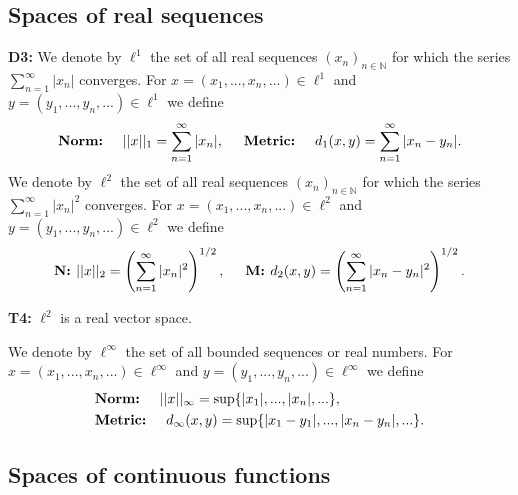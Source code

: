 \documentclass[twocolumn,10pt]{article}
\begin{document}
\subsection*{Spaces of real sequences}

\textbf{D3:} We denote by $\ell^1$ the set of all real sequences $(x_n)_{n\in\mathbb{N}}$ for which the series $\sum_{n=1}^{\infty}|x_n|$ converges. For $x=(x_1,...,x_n,...)\in\ell^1$ and $y=(y_1,...,y_n,...)\in\ell^1$ we define
\begin{equation*}
    \textbf{Norm:} \hspace{0.5cm} ||x||_1 = \sum_{n=1}^{\infty}|x_n|, \hspace{0.5cm} \textbf{Metric:} \hspace{0.5cm} d_1(x,y) = \sum_{n=1}^{\infty}|x_n-y_n|.
\end{equation*}
We denote by $\ell^2$ the set of all real sequences $(x_n)_{n\in\mathbb{N}}$ for which the series $\sum_{n=1}^{\infty}|x_n|^2$ converges. For $x=(x_1,...,x_n,...)\in\ell^2$ and $y=(y_1,...,y_n,...)\in\ell^2$ we define
\begin{equation*}
    \textbf{N: }||x||_2 = \left(\sum_{n=1}^{\infty}|x_n|^2\right)^{1/2}, \hspace{0.5cm} \textbf{M: } d_2(x,y) = \left(\sum_{n=1}^{\infty}|x_n-y_n|^2\right)^{1/2}.
\end{equation*}

\textbf{T4:} $\ell^2$ is a real vector space.

We denote by $\ell^{\infty}$ the set of all bounded sequences or real numbers. For $x=(x_1,...,x_n,...)\in\ell^{\infty}$ and $y=(y_1,...,y_n,...)\in\ell^{\infty}$ we define
\begin{align*}
    &\textbf{Norm:} \hspace{0.5cm} ||x||_{\infty} = \sup\{|x_1|,...,|x_n|,...\},\\
    &\textbf{Metric:} \hspace{0.5cm} d_{\infty}(x,y) = \sup\{|x_1-y_1|,...,|x_n-y_n|,...\}.
\end{align*}

\subsection*{Spaces of continuous functions}
\end{document}
